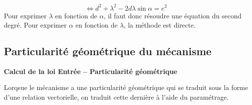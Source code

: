 \documentclass[10pt,oneside]{article}
\begin{document}
\begin{exemple}
$$
\Longleftrightarrow
d^2+ \lambda^2 - 2d\lambda\sin\alpha = e^2
$$
Pour exprimer $\lambda$ en fonction de $\alpha$, il faut donc résoudre une équation du second degré. Pour exprimer $\alpha$ en fonction de $\lambda$, la méthode est directe. 


\end{exemple}



\subsection{Particularité géométrique du mécanisme}


\begin{methode}
\textbf{Calcul de la loi Entrée -- Particularité géométrique}

Lorqsue le mécanisme a une particularité géométrique qui se traduit sous la forme d'une relation vectorielle, on traduit cette dernière à l'aide du paramétrage.

\end{methode}
\end{document}
